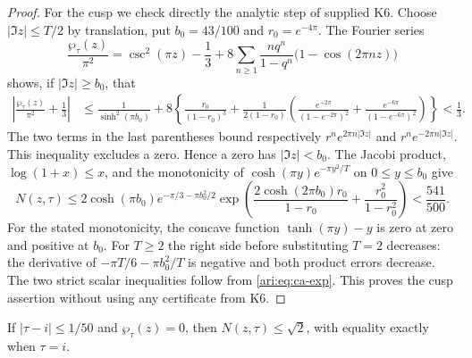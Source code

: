\begin{proof}
For the cusp we check directly the analytic step of supplied K6.
Choose $|\Im z|\le T/2$ by translation, put $b_0=43/100$ and
$r_0=e^{-4\pi}$. The Fourier series
\[
 \frac{\wp_\tau(z)}{\pi^2}
 =\csc^2(\pi z)-\frac13
   +8\sum_{n\ge1}\frac{nq^n}{1-q^n}
          \bigl(1-\cos(2\pi nz)\bigr)
\]
shows, if $|\Im z|\ge b_0$, that
\begin{align*}
 \left|\frac{\wp_\tau(z)}{\pi^2}+\frac13\right|
 &\le \frac1{\sinh^2(\pi b_0)}
 +8\left\{\frac{r_0}{(1-r_0)^3}
 +\frac1{2(1-r_0)}
 \left(\frac{e^{-2\pi}}{(1-e^{-2\pi})^2}
       +\frac{e^{-6\pi}}{(1-e^{-6\pi})^2}\right)\right\}
 <\frac13.
\end{align*}
The two terms in the last parentheses bound respectively
$r^n e^{2\pi n|\Im z|}$ and $r^n e^{-2\pi n|\Im z|}$.
This inequality excludes a zero. Hence a zero has
$|\Im z|<b_0$. The Jacobi product, $\log(1+x)\le x$, and
the monotonicity of $\cosh(\pi y)e^{-\pi y^2/T}$ on
$0\le y\le b_0$ give
\[
 N(z,\tau)\le
 2\cosh(\pi b_0)e^{-\pi/3-\pi b_0^2/2}
 \exp\!\left(
 \frac{2\cosh(2\pi b_0)r_0}{1-r_0}
 +\frac{r_0^2}{1-r_0^2}\right)<\frac{541}{500}.
\]
For the stated monotonicity, the concave function
$\tanh(\pi y)-y$ is zero at zero and positive at $b_0$.
For $T\ge2$ the right side before substituting $T=2$ decreases:
the derivative of $-\pi T/6-\pi b_0^2/T$ is negative and
both product errors decrease. The two strict scalar inequalities
follow from \eqref{ari:eq:ca-exp}. This proves the cusp assertion
without using any certificate from K6.
\end{proof}

\begin{proposition}\label{ari:C.8.2}
If $|\tau-i|\le1/50$ and $\wp_\tau(z)=0$, then
$N(z,\tau)\le\sqrt2$, with equality exactly when $\tau=i$.
\end{proposition}

